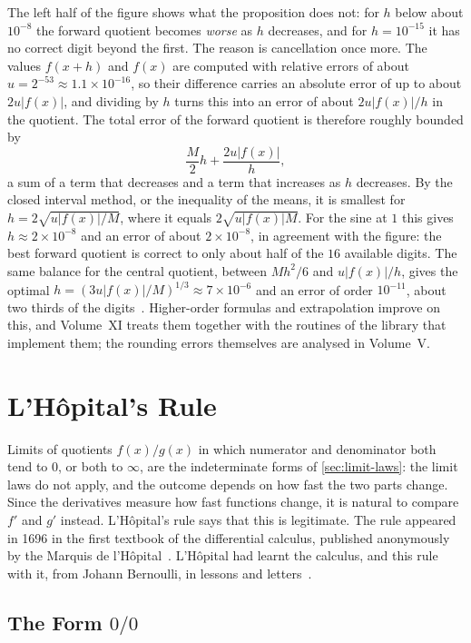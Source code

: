 The left half of the figure shows what the proposition does not: for $h$ below about $10^{-8}$ the forward quotient becomes \emph{worse} as $h$ decreases, and for $h=10^{-15}$ it has no correct digit beyond the first. The reason is cancellation once more. The values $f(x+h)$ and $f(x)$ are computed with relative errors of about $u=2^{-53}\approx1.1\times10^{-16}$, so their difference carries an absolute error of up to about $2u|f(x)|$, and dividing by $h$ turns this into an error of about $2u|f(x)|/h$ in the quotient. The total error of the forward quotient is therefore roughly bounded by
\[
\frac M2h+\frac{2u|f(x)|}h ,
\]
a sum of a term that decreases and a term that increases as $h$ decreases. By the closed interval method, or the inequality of the means, it is smallest for $h=2\sqrt{u|f(x)|/M}$, where it equals $2\sqrt{u|f(x)|M}$. For the sine at $1$ this gives $h\approx2\times10^{-8}$ and an error of about $2\times10^{-8}$, in agreement with the figure: the best forward quotient is correct to only about half of the $16$ available digits. The same balance for the central quotient, between $Mh^2/6$ and $u|f(x)|/h$, gives the optimal $h=(3u|f(x)|/M)^{1/3}\approx7\times10^{-6}$ and an error of order $10^{-11}$, about two thirds of the digits~\cite{nocedal2006}. Higher-order formulas and extrapolation improve on this, and Volume~XI treats them together with the routines of the library that implement them; the rounding errors themselves are analysed in Volume~V.

\section{L'H\^opital's Rule}
\label{sec:lhopital}

Limits of quotients $f(x)/g(x)$ in which numerator and denominator both tend to $0$, or both to $\infty$, are the indeterminate forms of \cref{sec:limit-laws}: the limit laws do not apply, and the outcome depends on how fast the two parts change. Since the derivatives measure how fast functions change, it is natural to compare $f'$ and $g'$ instead. L'H\^opital's rule says that this is legitimate. The rule appeared in 1696 in the first textbook of the differential calculus, published anonymously by the Marquis de l'H\^opital~\cite{lhopital1696}. L'H\^opital had learnt the calculus, and this rule with it, from Johann Bernoulli, in lessons and letters~\cite{edwards1979}.

\subsection{The Form \texorpdfstring{$0/0$}{0/0}}

